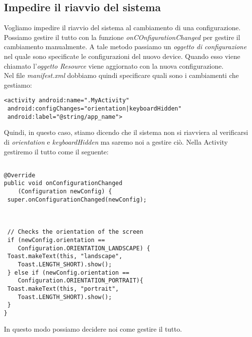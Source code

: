 \subsection{Impedire il riavvio del sistema}
Vogliamo impedire il riavvio del sistema al cambiamento di una configurazione.
Possiamo gestire il tutto con la funzione \textit{onCOnfigurationChanged} per
gestire il cambiamento manualmente. A tale metodo passiamo un \textit{oggetto di
configurazione} nel quale sono specificate le configurazioni del nuovo device.
Quando esso viene chiamato l'\textit{oggetto Resource} viene aggiornato con la
nuova configurazione.\\
Nel file \textit{manifest.xml} dobbiamo quindi specificare quali sono i
cambiamenti che gestiamo:
\begin{lstlisting}[frame=single]  % Start your code-block
<activity android:name=".MyActivity"
 android:configChanges="orientation|keyboardHidden"
 android:label="@string/app_name">
\end{lstlisting}
Quindi, in questo caso, stiamo dicendo che il sistema non si riavviera al
verificarsi di \textit{orientation} e \textit{keyboardHidden} ma saremo noi a
gestire ciò.
Nella Activity gestiremo il tutto come il seguente:

\begin{lstlisting}[frame=single]  % Start your code-block

@Override
public void onConfigurationChanged
    (Configuration newConfig) {
 super.onConfigurationChanged(newConfig);



 // Checks the orientation of the screen
 if (newConfig.orientation ==
    Configuration.ORIENTATION_LANDSCAPE) {
 Toast.makeText(this, "landscape",
    Toast.LENGTH_SHORT).show();
 } else if (newConfig.orientation ==
    Configuration.ORIENTATION_PORTRAIT){
 Toast.makeText(this, "portrait",
    Toast.LENGTH_SHORT).show();
 }
}
\end{lstlisting}
In questo modo possiamo decidere noi come gestire il tutto.

